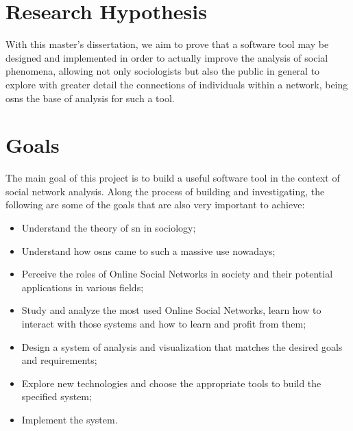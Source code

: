 \section{Research Hypothesis}
With this master's dissertation, we aim to prove that a software tool may be designed and implemented in order to actually improve the analysis of social phenomena, allowing not only sociologists but also the public in general to explore with greater
detail the connections of individuals within a network, being \glspl{osn} the base of analysis for such a tool.

\section{Goals}

The main goal of this project is to build a useful software tool in the context of social network analysis. Along the process of building and investigating, the following are some of the goals that are also very important to achieve:

\begin{itemize}
\item Understand the theory of \gls{sn} in sociology;
\item Understand how \glspl{osn} came to such a massive use nowadays;
\item Perceive the roles of Online Social Networks in society and their potential applications in various fields;
\item Study and analyze the most used Online Social Networks, learn how to interact with those systems and how to learn and profit from them;
\item Design a system of analysis and visualization that matches the desired goals and requirements;
\item Explore new technologies and choose the appropriate tools to build the specified system;
\item Implement the system.
\end{itemize}


